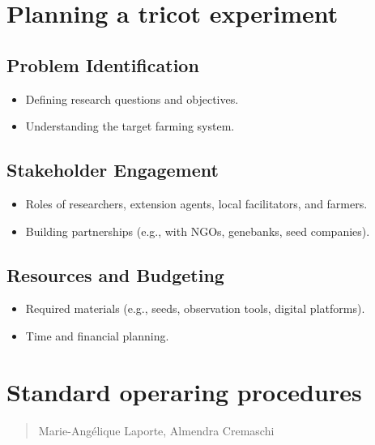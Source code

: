 \documentclass[
]{book}
\providecommand{\tightlist}{%
  \setlength{\itemsep}{0pt}\setlength{\parskip}{0pt}}
\begin{document}
\chapter{Planning a tricot experiment}\label{planning-a-tricot-experiment}

\section{Problem Identification}\label{problem-identification}

\begin{itemize}
\tightlist
\item
  Defining research questions and objectives.
\item
  Understanding the target farming system.
\end{itemize}

\section{Stakeholder Engagement}\label{stakeholder-engagement}

\begin{itemize}
\tightlist
\item
  Roles of researchers, extension agents, local facilitators, and farmers.
\item
  Building partnerships (e.g., with NGOs, genebanks, seed companies).
\end{itemize}

\section{Resources and Budgeting}\label{resources-and-budgeting}

\begin{itemize}
\tightlist
\item
  Required materials (e.g., seeds, observation tools, digital platforms).
\item
  Time and financial planning.
\end{itemize}

\chapter{Standard operaring procedures}\label{standard-operaring-procedures}

\begin{quote}
Marie-Angélique Laporte, Almendra Cremaschi
\end{quote}
\end{document}
